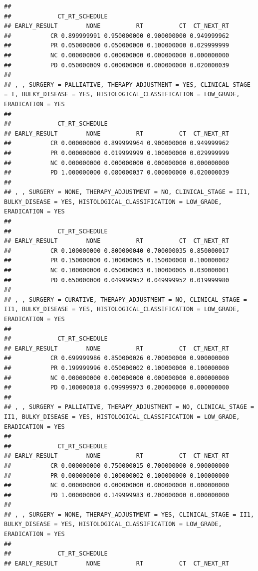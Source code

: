 \documentclass[]{article}
\begin{document}
\begin{verbatim}
## 
##             CT_RT_SCHEDULE
## EARLY_RESULT        NONE          RT          CT  CT_NEXT_RT
##           CR 0.899999991 0.950000000 0.900000000 0.949999962
##           PR 0.050000000 0.050000000 0.100000000 0.029999999
##           NC 0.000000000 0.000000000 0.000000000 0.000000000
##           PD 0.050000009 0.000000000 0.000000000 0.020000039
## 
## , , SURGERY = PALLIATIVE, THERAPY_ADJUSTMENT = YES, CLINICAL_STAGE = I, BULKY_DISEASE = YES, HISTOLOGICAL_CLASSIFICATION = LOW_GRADE, ERADICATION = YES
## 
##             CT_RT_SCHEDULE
## EARLY_RESULT        NONE          RT          CT  CT_NEXT_RT
##           CR 0.000000000 0.899999964 0.900000000 0.949999962
##           PR 0.000000000 0.019999999 0.100000000 0.029999999
##           NC 0.000000000 0.000000000 0.000000000 0.000000000
##           PD 1.000000000 0.080000037 0.000000000 0.020000039
## 
## , , SURGERY = NONE, THERAPY_ADJUSTMENT = NO, CLINICAL_STAGE = II1, BULKY_DISEASE = YES, HISTOLOGICAL_CLASSIFICATION = LOW_GRADE, ERADICATION = YES
## 
##             CT_RT_SCHEDULE
## EARLY_RESULT        NONE          RT          CT  CT_NEXT_RT
##           CR 0.100000000 0.800000040 0.700000035 0.850000017
##           PR 0.150000000 0.100000005 0.150000008 0.100000002
##           NC 0.100000000 0.050000003 0.100000005 0.030000001
##           PD 0.650000000 0.049999952 0.049999952 0.019999980
## 
## , , SURGERY = CURATIVE, THERAPY_ADJUSTMENT = NO, CLINICAL_STAGE = II1, BULKY_DISEASE = YES, HISTOLOGICAL_CLASSIFICATION = LOW_GRADE, ERADICATION = YES
## 
##             CT_RT_SCHEDULE
## EARLY_RESULT        NONE          RT          CT  CT_NEXT_RT
##           CR 0.699999986 0.850000026 0.700000000 0.900000000
##           PR 0.199999996 0.050000002 0.100000000 0.100000000
##           NC 0.000000000 0.000000000 0.000000000 0.000000000
##           PD 0.100000018 0.099999973 0.200000000 0.000000000
## 
## , , SURGERY = PALLIATIVE, THERAPY_ADJUSTMENT = NO, CLINICAL_STAGE = II1, BULKY_DISEASE = YES, HISTOLOGICAL_CLASSIFICATION = LOW_GRADE, ERADICATION = YES
## 
##             CT_RT_SCHEDULE
## EARLY_RESULT        NONE          RT          CT  CT_NEXT_RT
##           CR 0.000000000 0.750000015 0.700000000 0.900000000
##           PR 0.000000000 0.100000002 0.100000000 0.100000000
##           NC 0.000000000 0.000000000 0.000000000 0.000000000
##           PD 1.000000000 0.149999983 0.200000000 0.000000000
## 
## , , SURGERY = NONE, THERAPY_ADJUSTMENT = YES, CLINICAL_STAGE = II1, BULKY_DISEASE = YES, HISTOLOGICAL_CLASSIFICATION = LOW_GRADE, ERADICATION = YES
## 
##             CT_RT_SCHEDULE
## EARLY_RESULT        NONE          RT          CT  CT_NEXT_RT

\end{verbatim}
\end{document}
